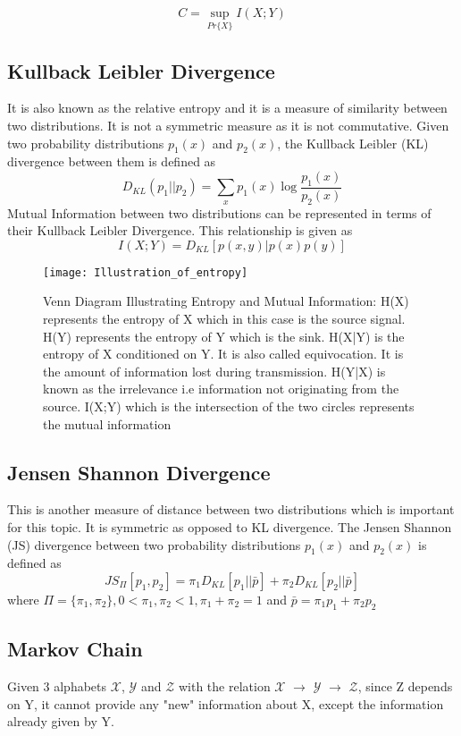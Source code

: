 \begin{equation}
C = \sup_{Pr\{X\}} I( X; Y)
\end{equation}

\subsection{Kullback Leibler Divergence}
It is also known as the relative entropy and it is a measure of similarity between two distributions. It is not a symmetric measure as it is not commutative. Given two probability distributions $p_1(x)$ and $p_2(x)$, the Kullback Leibler (KL) divergence between them is defined as
\begin{equation}
D_{KL}(p_1||p_2 ) = \sum_x p_1(x) \log \frac{p_1(x)}{p_2(x)}
\end{equation}
Mutual Information between two distributions can be represented in terms of their Kullback Leibler Divergence. This relationship is given as
\begin{equation}
I(X;Y) = D_{KL}[p(x, y) | p(x)p(y)]
\end{equation}
\begin{figure}
\centering
\texttt{[image: Illustration\_of\_entropy]}
\caption[Venn Diagram Illustrating Entropy and Mutual Information]{Venn Diagram Illustrating Entropy and Mutual Information: H(X) represents the entropy of X which in this case is the source signal. H(Y) represents the entropy of Y which is the sink. H(X|Y) is the entropy of X conditioned on Y. It is also called equivocation. It is the amount of information lost during transmission. H(Y|X) is known as the irrelevance i.e information not originating from the source. I(X;Y) which is the intersection of the two circles represents the mutual information }
\end{figure}
\subsection{Jensen Shannon Divergence}
This is another measure of distance between two distributions which is important for this topic. It is symmetric as opposed to KL divergence. The Jensen Shannon (JS) divergence between two probability distributions $p_1(x)$ and $p_2(x)$ is defined as
\begin{equation}
JS_{\Pi}[p_1, p_2] = \pi_1D_{KL}[p_1||\bar{p}] + \pi_2D_{KL}[p_2||\bar{p}]
\end{equation}
where \( \Pi = \{ \pi_1, \pi_2 \}, 0 < \pi_1, \pi_2 < 1, \pi_1 + \pi_2 = 1\) and  \(\bar{p} = \pi_1p_1 + \pi_2p_2\)
\subsection{Markov Chain}
Given 3 alphabets  $\mathcal{X}$, $\mathcal{Y}$ and $\mathcal{Z}$ with the relation $\mathcal{X}$ $\rightarrow$ $\mathcal{Y}$ $\rightarrow$ $\mathcal{Z}$,  since Z depends on Y, it cannot provide any "new" information about X, except the information already given by Y.
